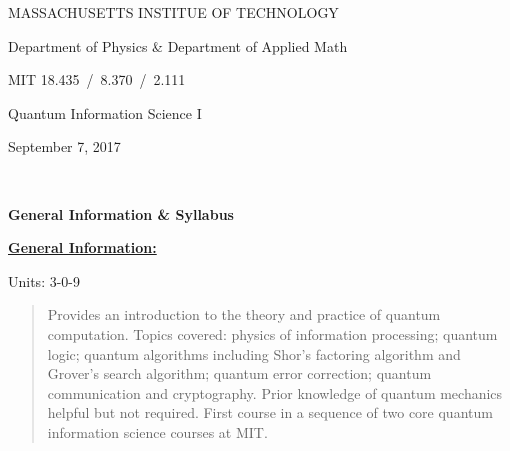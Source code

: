 \documentclass[preprint,pra,12pt]{ikedoc3}
\begin{document}

\centerline{\large MASSACHUSETTS INSTITUE OF TECHNOLOGY}
\vspace*{1ex}
\centerline{\large Department of Physics \& Department of Applied Math}
\vspace*{2ex}

\centerline{\large MIT 18.435 \,/\, 8.370 \,/\, 2.111}
\vspace*{1ex}

\centerline{\large Quantum Information Science I}
\vspace*{1ex}
\centerline{\large September 7, 2017}

~\\
\centerline{\large \bf General Information \& Syllabus}

\vspace*{4ex}

{\noindent\bf \underline{General Information:}} 

Units: 3-0-9

\begin{quote}
Provides an introduction to the theory and practice of quantum
computation. Topics covered: physics of information processing;
quantum logic; quantum algorithms including Shor's factoring algorithm
and Grover's search algorithm; quantum error correction; quantum
communication and cryptography. Prior knowledge of quantum mechanics
helpful but not required. First course in a sequence of two core
quantum information science courses at MIT.

\noindent
\end{quote}
\end{document}
